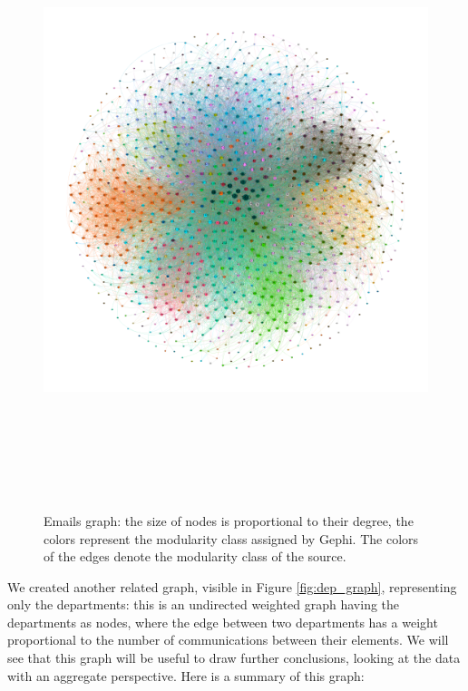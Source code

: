 \documentclass{report}
\theoremstyle{definition}
\theoremstyle{remark}
\begin{document}
\begin{figure} [H]
	\centering
	\centerline{\includegraphics[width = 24cm, height = 18cm, keepaspectratio]{eMail_graph.png}}
	\caption{Emails graph: the size of nodes is proportional to their degree, the colors represent the modularity class assigned by Gephi. The colors of the edges denote the modularity class of the source.} \label{fig:mail_graph}
\end{figure}

We created another related graph, visible in Figure \ref{fig:dep_graph}, representing only the departments: this is an undirected weighted graph having the departments as nodes, where the edge between two departments has a weight proportional to the number of communications between their elements. We will see that this graph will be useful to draw further conclusions, looking at the data with an aggregate perspective. Here is a summary of this graph:
\end{document}
